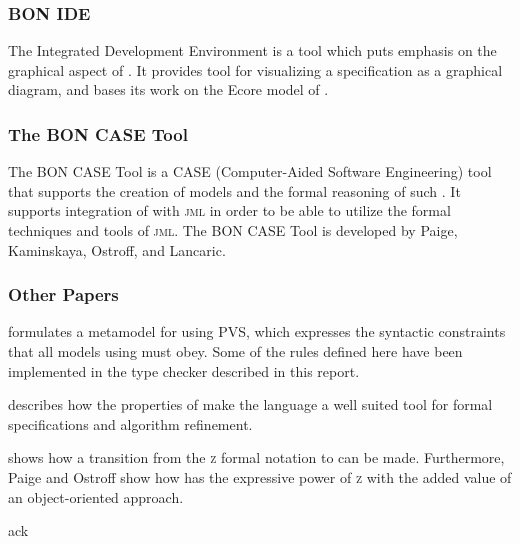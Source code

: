 \subsubsection{BON IDE}
The \bon{} Integrated Development Environment is a tool which puts emphasis on the graphical aspect of \bon{} \cite{bonide}. It provides tool for visualizing a \bon{} specification as a graphical diagram, and bases its work on the Ecore model of \bon{}.

\subsubsection{The BON CASE Tool}
The BON CASE Tool is a CASE (Computer-Aided Software Engineering) tool that supports the creation of \bon{} models and the formal reasoning of such \cite{boncase}. It supports integration of \bon{} with \textsc{jml} in order to be able to utilize the formal techniques and tools of \textsc{jml}. The BON CASE Tool is developed by Paige, Kaminskaya, Ostroff, and Lancaric.

\subsubsection{Other Papers}
\cite{ostroff2001} formulates a metamodel for \bon{} using PVS, which expresses the syntactic constraints that all models using \bon{} must obey. Some of the rules defined here have been implemented in the type checker described in this report.

\cite{ostroff1999} describes how the properties of \bon{} make the language a well suited tool for formal specifications and algorithm refinement.

\cite{ostroff1998} shows how a transition from the \textsc{z} formal notation to \bon{} can be made. Furthermore, Paige and Ostroff show how \bon{} has the expressive power of \textsc{z} with the added value of an object-oriented approach.

{ack}